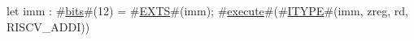 let imm : #\hyperref[sailRISCVzbits]{bits}#(12) = #\hyperref[sailRISCVzEXTS]{EXTS}#(imm);
#\hyperref[sailRISCVzexecute]{execute}#(#\hyperref[sailRISCVzITYPE]{ITYPE}#(imm, zreg, rd, RISCV_ADDI))
